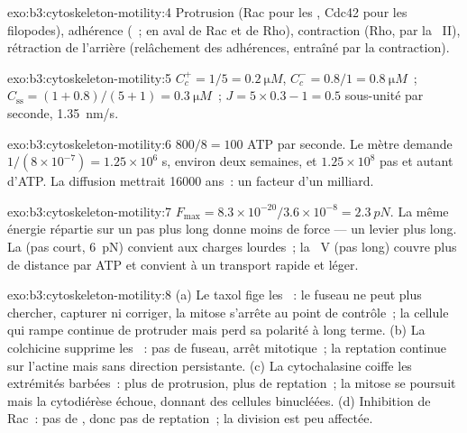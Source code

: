 \begin{solution}{exo:b3:cytoskeleton-motility:4}
Protrusion (Rac pour les , Cdc42 pour les filopodes),
adhérence (~; en aval de Rac et de Rho), contraction (Rho, par
la ~II), rétraction de l'arrière (relâchement des adhérences,
entraîné par la contraction).
\end{solution}

\begin{solution}{exo:b3:cytoskeleton-motility:5}
$C_{c}^{+} = 1/5 = \qty{0.2}{\micro M}$, $C_{c}^{-} = 0.8/1 =
\qty{0.8}{\micro M}$~; $C_{\text{ss}} = (1 + 0.8)/(5 + 1) = \qty{0.3}{\micro
M}$~; $J = 5\times 0.3 - 1 = 0.5$ sous-unité par seconde, \qty{1.35}{nm/s}.
\end{solution}

\begin{solution}{exo:b3:cytoskeleton-motility:6}
$800/8 = 100$ ATP par seconde. Le mètre demande $1/(8\times 10^{-7}) =
1.25\times 10^{6}$ s, environ deux semaines, et $1.25\times 10^{8}$ pas
et autant d'ATP. La diffusion mettrait \num{16000} ans~: un facteur d'un
milliard.
\end{solution}

\begin{solution}{exo:b3:cytoskeleton-motility:7}
$F_{\max} = 8.3\times 10^{-20}/3.6\times 10^{-8} = \qty{2.3}{pN}$. La
même énergie répartie sur un pas plus long donne moins de force --- un
levier plus long. La  (pas court, \qty{6}{pN}) convient aux
charges lourdes~; la ~V (pas long) couvre plus de distance par
ATP et convient à un transport rapide et léger.
\end{solution}

\begin{solution}{exo:b3:cytoskeleton-motility:8}
(a) Le taxol fige les ~: le fuseau ne peut plus chercher,
capturer ni corriger, la mitose s'arrête au point de contrôle~; la
cellule qui rampe continue de protruder mais perd sa polarité à long
terme. (b) La colchicine supprime les ~: pas de fuseau,
arrêt mitotique~; la reptation continue sur l'actine mais sans
direction persistante. (c) La cytochalasine coiffe les extrémités
barbées~: plus de protrusion, plus de reptation~; la mitose se poursuit
mais la cytodiérèse échoue, donnant des cellules binucléées. (d)
Inhibition de Rac~: pas de , donc pas de reptation~; la
division est peu affectée.
\end{solution}

